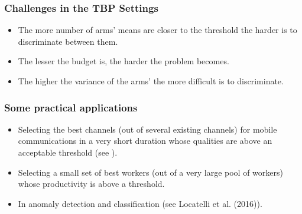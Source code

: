 \begin{frame}
\frametitle{Challenges in the TBP Settings}
\begin{itemize}
\item<1-> The more number of arms' means are closer to the threshold the harder is to discriminate between them.
\item<2-> The lesser the budget is, the harder the problem becomes.
\item<3-> The higher the variance of the arms' the more difficult is to discriminate.
\end{itemize}
\end{frame}


\begin{frame}
\frametitle{Some practical applications}
\begin{itemize}
\item<1-> Selecting the best channels (out of several existing channels) for mobile communications in a very short duration whose qualities are above an acceptable threshold (see \cite{audibert2010best}).
\item<2-> Selecting a small set of best workers (out of a very large pool of workers) whose productivity is above a threshold.
\item<3-> In anomaly detection and classification (see {Locatelli et al. (2016)}).
\end{itemize}
\end{frame}


